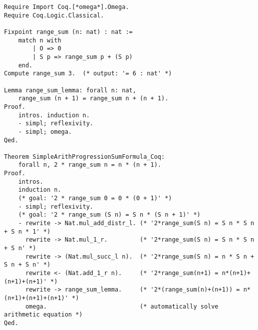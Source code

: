 \documentclass[article]{aaltoseries}
\begin{document}
\begin{lstlisting}[language=coq, caption={Proof of the formula for sum of n first number in Coq}, label={ex_nat_sum_coq}]
Require Import Coq.[*omega*].Omega.
Require Coq.Logic.Classical.

Fixpoint range_sum (n: nat) : nat :=
    match n with
        | O => 0
        | S p => range_sum p + (S p)
    end.
Compute range_sum 3.  (* output: '= 6 : nat' *)

Lemma range_sum_lemma: forall n: nat,
    range_sum (n + 1) = range_sum n + (n + 1).
Proof.
    intros. induction n.
    - simpl; reflexivity.
    - simpl; omega.
Qed.

Theorem SimpleArithProgressionSumFormula_Coq:
    forall n, 2 * range_sum n = n * (n + 1).
Proof.
    intros.
    induction n.
    (* goal: '2 * range_sum 0 = 0 * (0 + 1)' *)
    - simpl; reflexivity.
    (* goal: '2 * range_sum (S n) = S n * (S n + 1)' *)
    - rewrite -> Nat.mul_add_distr_l. (* '2*range_sum(S n) = S n * S n + S n * 1' *)
      rewrite -> Nat.mul_1_r.         (* '2*range_sum(S n) = S n * S n + S n' *)
      rewrite -> (Nat.mul_succ_l n).  (* '2*range_sum(S n) = n * S n + S n + S n' *)
      rewrite <- (Nat.add_1_r n).     (* '2*range_sum(n+1) = n*(n+1)+(n+1)+(n+1)' *)
      rewrite -> range_sum_lemma.     (* '2*(range_sum(n)+(n+1)) = n*(n+1)+(n+1)+(n+1)' *)
      omega.                          (* automatically solve arithmetic equation *)
Qed.
\end{lstlisting}











\end{document}
